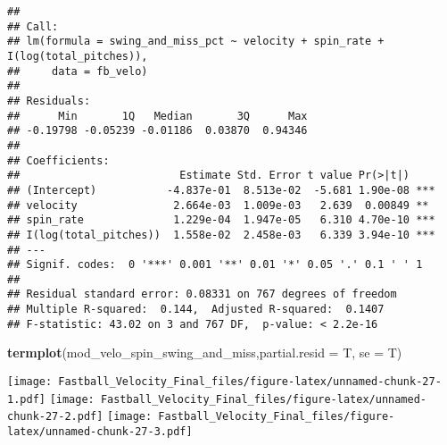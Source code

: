 \documentclass[]{article}
\newenvironment{Shaded}{\begin{snugshade}}{\end{snugshade}}
\newcommand{\KeywordTok}[1]{\textcolor[rgb]{0.13,0.29,0.53}{\textbf{#1}}}
\newcommand{\DataTypeTok}[1]{\textcolor[rgb]{0.13,0.29,0.53}{#1}}
\newcommand{\NormalTok}[1]{#1}
\begin{document}
\begin{verbatim}
## 
## Call:
## lm(formula = swing_and_miss_pct ~ velocity + spin_rate + I(log(total_pitches)), 
##     data = fb_velo)
## 
## Residuals:
##      Min       1Q   Median       3Q      Max 
## -0.19798 -0.05239 -0.01186  0.03870  0.94346 
## 
## Coefficients:
##                         Estimate Std. Error t value Pr(>|t|)    
## (Intercept)           -4.837e-01  8.513e-02  -5.681 1.90e-08 ***
## velocity               2.664e-03  1.009e-03   2.639  0.00849 ** 
## spin_rate              1.229e-04  1.947e-05   6.310 4.70e-10 ***
## I(log(total_pitches))  1.558e-02  2.458e-03   6.339 3.94e-10 ***
## ---
## Signif. codes:  0 '***' 0.001 '**' 0.01 '*' 0.05 '.' 0.1 ' ' 1
## 
## Residual standard error: 0.08331 on 767 degrees of freedom
## Multiple R-squared:  0.144,  Adjusted R-squared:  0.1407 
## F-statistic: 43.02 on 3 and 767 DF,  p-value: < 2.2e-16
\end{verbatim}

\begin{Shaded}
\begin{Highlighting}[]
\KeywordTok{termplot}\NormalTok{(mod_velo_spin_swing_and_miss,}\DataTypeTok{partial.resid =}\NormalTok{ T, }\DataTypeTok{se =}\NormalTok{ T)}
\end{Highlighting}
\end{Shaded}

\texttt{[image: Fastball\_Velocity\_Final\_files/figure-latex/unnamed-chunk-27-1.pdf]}
\texttt{[image: Fastball\_Velocity\_Final\_files/figure-latex/unnamed-chunk-27-2.pdf]}
\texttt{[image: Fastball\_Velocity\_Final\_files/figure-latex/unnamed-chunk-27-3.pdf]}
\end{document}

